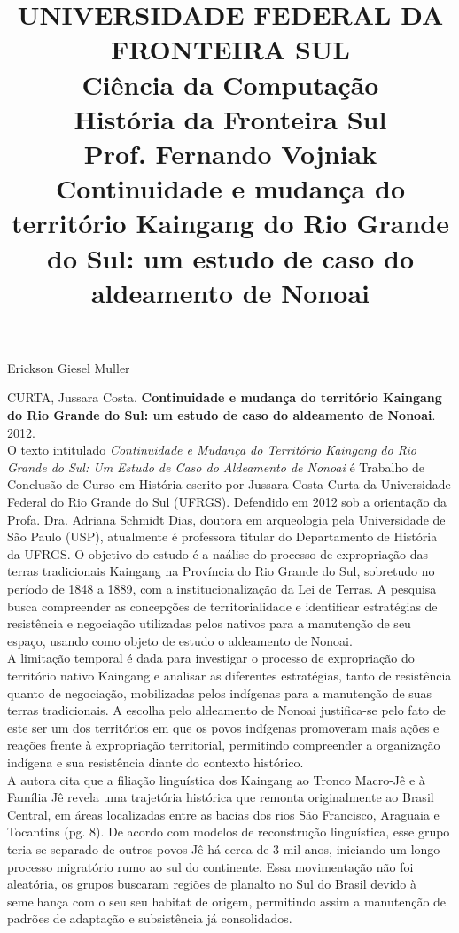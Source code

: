 \documentclass[12pt, a4paper]{article}
\title{UNIVERSIDADE FEDERAL DA FRONTEIRA SUL\\Ciência da Computação\\História da Fronteira Sul\\Prof. Fernando Vojniak\\Continuidade e mudança do território Kaingang do Rio Grande do Sul: um estudo de caso do aldeamento de Nonoai}
\date{}
\begin{document}
\maketitle

\begin{flushright}
	Erickson Giesel Muller
\end{flushright}

	CURTA, Jussara Costa. \textbf{Continuidade e mudança do território Kaingang do Rio Grande do Sul: um estudo de caso do aldeamento de Nonoai}. 2012.
	\\

	O texto intitulado \textit{Continuidade e Mudança do Território Kaingang do Rio Grande do Sul: Um Estudo de Caso do Aldeamento de Nonoai} é Trabalho de Conclusão de Curso em História escrito por Jussara Costa Curta da Universidade Federal do Rio Grande do Sul (UFRGS). Defendido em 2012 sob a orientação da Profa. Dra. Adriana Schmidt Dias, doutora em arqueologia pela Universidade de São Paulo (USP), atualmente é professora titular do Departamento de História da UFRGS. O objetivo do estudo é a naálise do processo de expropriação das terras tradicionais Kaingang na Província do Rio Grande do Sul, sobretudo no período de 1848 a 1889, com a institucionalização da Lei de Terras. A pesquisa busca compreender as concepções de territorialidade e identificar estratégias de resistência e negociação utilizadas pelos nativos para a manutenção de seu espaço, usando como objeto de estudo o aldeamento de Nonoai.
	\\

A limitação temporal é dada para investigar o processo de expropriação do território nativo Kaingang e analisar as diferentes estratégias, tanto de resistência quanto de negociação, mobilizadas pelos indígenas para a manutenção de suas terras tradicionais. A escolha pelo aldeamento de Nonoai justifica-se pelo fato de este ser um dos territórios em que os povos indígenas promoveram mais ações e reações frente à expropriação territorial, permitindo compreender a organização indígena e sua resistência diante do contexto histórico.
\\

A autora cita que a filiação linguística dos Kaingang ao Tronco Macro-Jê e à Família Jê revela uma trajetória histórica que remonta originalmente ao Brasil Central, em áreas localizadas entre as bacias dos rios São Francisco, Araguaia e Tocantins (pg. 8). De acordo com modelos de reconstrução linguística, esse grupo teria se separado de outros povos Jê há cerca de 3 mil anos, iniciando um longo processo migratório rumo ao sul do continente. Essa movimentação não foi aleatória, os grupos buscaram regiões de planalto no Sul do Brasil devido à semelhança com o seu seu habitat de origem, permitindo assim a manutenção de padrões de adaptação e subsistência já consolidados.
\\
\end{document}
